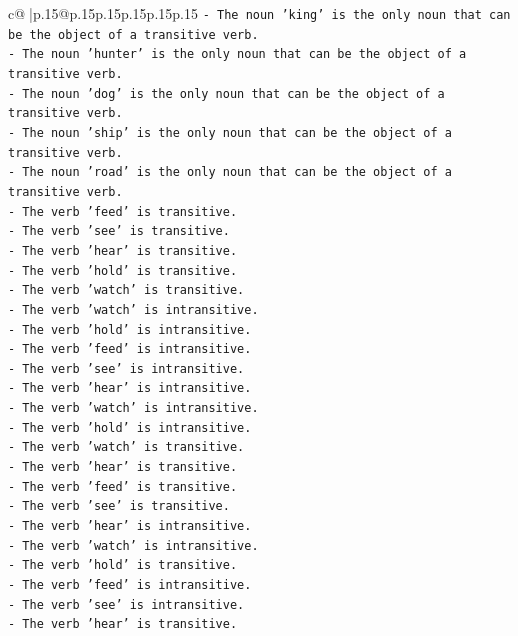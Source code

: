 \documentclass{article}
\begin{document}
{\begin{supertabular}{c@{$\;$}|p{.15\linewidth}@{}p{.15\linewidth}p{.15\linewidth}p{.15\linewidth}p{.15\linewidth}p{.15\linewidth}}
{{{\texttt{{-} The noun 'king' is the only noun that can be the object of a transitive verb.} \\
\texttt{{-} The noun 'hunter' is the only noun that can be the object of a transitive verb.} \\
\texttt{{-} The noun 'dog' is the only noun that can be the object of a transitive verb.} \\
\texttt{{-} The noun 'ship' is the only noun that can be the object of a transitive verb.} \\
\texttt{{-} The noun 'road' is the only noun that can be the object of a transitive verb.} \\
\texttt{{-} The verb 'feed' is transitive.} \\
\texttt{{-} The verb 'see' is transitive.} \\
\texttt{{-} The verb 'hear' is transitive.} \\
\texttt{{-} The verb 'hold' is transitive.} \\
\texttt{{-} The verb 'watch' is transitive.} \\
\texttt{{-} The verb 'watch' is intransitive.} \\
\texttt{{-} The verb 'hold' is intransitive.} \\
\texttt{{-} The verb 'feed' is intransitive.} \\
\texttt{{-} The verb 'see' is intransitive.} \\
\texttt{{-} The verb 'hear' is intransitive.} \\
\texttt{{-} The verb 'watch' is intransitive.} \\
\texttt{{-} The verb 'hold' is intransitive.} \\
\texttt{{-} The verb 'watch' is transitive.} \\
\texttt{{-} The verb 'hear' is transitive.} \\
\texttt{{-} The verb 'feed' is transitive.} \\
\texttt{{-} The verb 'see' is transitive.} \\
\texttt{{-} The verb 'hear' is intransitive.} \\
\texttt{{-} The verb 'watch' is intransitive.} \\
\texttt{{-} The verb 'hold' is transitive.} \\
\texttt{{-} The verb 'feed' is intransitive.} \\
\texttt{{-} The verb 'see' is intransitive.} \\
\texttt{{-} The verb 'hear' is transitive.} \\
}}}
\end{supertabular}}
\end{document}
